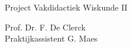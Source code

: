 \documentclass[12pt]{article}
\numberwithin{equation}{section} %
\theoremstyle{plain}  \newtheorem{stel}{Stelling}[section]
\theoremstyle{plain}  \newtheorem{lemma}[stel]{Lemma}
\theoremstyle{plain}  \newtheorem{gevolg}[stel]{Gevolg}
\theoremstyle{definition}  \newtheorem{defi}[stel]{Definitie}
\theoremstyle{definition} \newtheorem{vb}[stel]{Voorbeeld}
\theoremstyle{definition} \newtheorem{vbn}[stel]{Voorbeelden}
\theoremstyle{definition}  \newtheorem{opm}[stel]{Opmerking}
\theoremstyle{plain}  \newtheorem{opdracht}{Opdracht}
\begin{document}
\vfill

\hspace*{\fill}
\begin{minipage}{8cm}
\noindent   Project Vakdidactiek Wiskunde II
\end{minipage}

  \bigskip

  \hspace*{\fill}
  \begin{minipage}{8cm}
  \noindent  Prof. Dr.  F. De Clerck\\
  Praktijkassistent G. Maes
\end{minipage}

\newpage
\tableofcontents 
\newpage



\newpage

\newpage

\newpage

\newpage

\newpage

\end{document}
